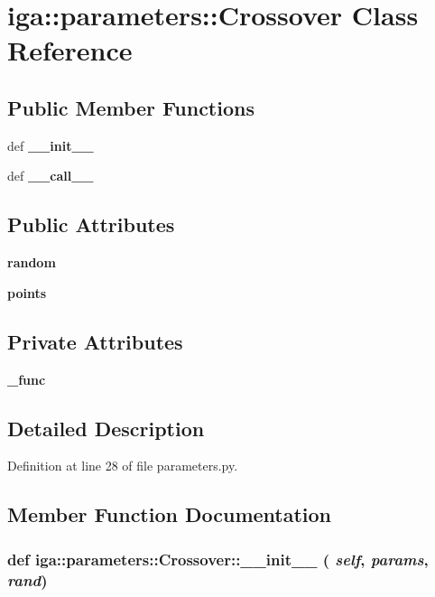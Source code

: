 \section{iga::parameters::Crossover Class Reference}
\label{classiga_1_1parameters_1_1Crossover}
\subsection*{Public Member Functions}
\begin{CompactItemize}
\item 
def {\bf \_\-\_\-init\_\-\_\-}
\item 
def {\bf \_\-\_\-call\_\-\_\-}
\end{CompactItemize}
\subsection*{Public Attributes}
\begin{CompactItemize}
\item 
{\bf random}
\item 
{\bf points}
\end{CompactItemize}
\subsection*{Private Attributes}
\begin{CompactItemize}
\item 
{\bf \_\-func}
\end{CompactItemize}


\subsection{Detailed Description}


Definition at line 28 of file parameters.py.

\subsection{Member Function Documentation}
\subsubsection{\setlength{\rightskip}{0pt plus 5cm}def iga::parameters::Crossover::\_\-\_\-init\_\-\_\- ( {\em self},  {\em params},  {\em rand})}\label{classiga_1_1parameters_1_1Crossover_3cf7d9616b56e260770ef710e83e512c}





